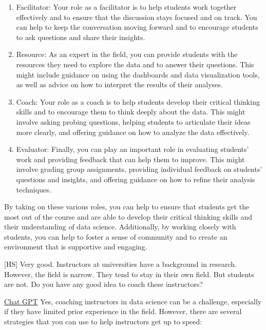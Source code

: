 \documentclass[
]{bxjsbook}
\providecommand{\tightlist}{%
  \setlength{\itemsep}{0pt}\setlength{\parskip}{0pt}}
\theoremstyle{definition}
\theoremstyle{definition}
\theoremstyle{definition}
\theoremstyle{definition}
\theoremstyle{remark}
\begin{document}
\begin{enumerate}
\def\labelenumi{\arabic{enumi}.}
\tightlist
\item
  Facilitator: Your role as a facilitator is to help students work together effectively and to ensure that the discussion stays focused and on track. You can help to keep the conversation moving forward and to encourage students to ask questions and share their insights.
\item
  Resource: As an expert in the field, you can provide students with the resources they need to explore the data and to answer their questions. This might include guidance on using the dashboards and data visualization tools, as well as advice on how to interpret the results of their analyses.
\item
  Coach: Your role as a coach is to help students develop their critical thinking skills and to encourage them to think deeply about the data. This might involve asking probing questions, helping students to articulate their ideas more clearly, and offering guidance on how to analyze the data effectively.
\item
  Evaluator: Finally, you can play an important role in evaluating students' work and providing feedback that can help them to improve. This might involve grading group assignments, providing individual feedback on students' questions and insights, and offering guidance on how to refine their analysis techniques.
\end{enumerate}

By taking on these various roles, you can help to ensure that students get the most out of the course and are able to develop their critical thinking skills and their understanding of data science. Additionally, by working closely with students, you can help to foster a sense of community and to create an environment that is supportive and engaging.

{[}HS{]} Very good. Instructors at universities have a background in research. However, the field is narrow. They tend to stay in their own field. But students are not. Do you have any good idea to coach these instructors?

\protect\hyperlink{chatgpt}{Chat GPT} Yes, coaching instructors in data science can be a challenge, especially if they have limited prior experience in the field. However, there are several strategies that you can use to help instructors get up to speed:
\end{document}
